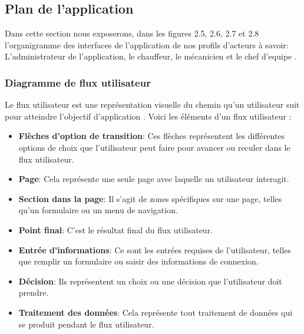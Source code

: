 \subsection{Plan de l'application}
Dans cette section nous exposerons, dans les figures 2.5, 2.6, 2.7 et 2.8 l'organigramme des interfaces de l'application de nos profils d'acteurs à savoir: L'administrateur de l'application, le chauffeur, le mécanicien  et le chef d'equipe .\\

\subsubsection{Diagramme de flux utilisateur}
Le flux utilisateur est une représentation visuelle du chemin qu'un utilisateur suit pour atteindre l’objectif d’application . Voici les éléments d'un flux utilisateur : \\

\begin{itemize}[label=$\bullet$]
  \item \textbf{Flèches d'option de transition}: Ces flèches représentent les différentes options de choix que l'utilisateur peut faire pour avancer ou reculer dans le flux utilisateur.

  \item \textbf{Page}: Cela représente une seule page avec laquelle un utilisateur interagit.

  \item \textbf{Section dans la page}: Il s'agit de zones spécifiques sur une page, telles qu'un formulaire ou un menu de navigation.

  \item \textbf{Point final}: C'est le résultat final du flux utilisateur.

  \item \textbf{Entrée d'informations}: Ce sont les entrées requises de l'utilisateur, telles que remplir un formulaire ou saisir des informations de connexion.

  \item \textbf{Décision}: Ils représentent un choix ou une décision que l'utilisateur doit prendre.

  \item \textbf{Traitement des données}: Cela représente tout traitement de données qui se produit pendant le flux utilisateur.
\end{itemize}

